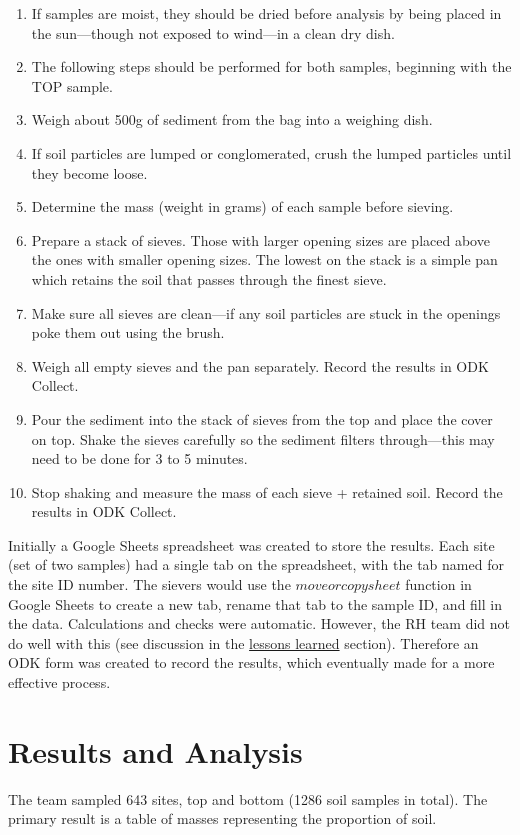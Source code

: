 \documentclass[a4paper,12pt]{article}
\begin{document}
\begin{enumerate}
  \item If samples are moist, they should be dried before analysis by being placed in the sun---though not exposed to wind---in a clean dry dish. 
  \item The following steps should be performed for both samples, beginning with the TOP sample.
  \item Weigh about 500g of sediment from the bag into a weighing dish.
  \item If soil particles are lumped or conglomerated, crush the lumped particles until they become loose.
  \item Determine the mass (weight in grams) of each sample before sieving.
  \item Prepare a stack of sieves. Those with larger opening sizes are placed above the ones with smaller opening sizes. The lowest on the stack is a simple pan which retains the soil that passes through the finest sieve.
  \item Make sure all sieves are clean---if any soil particles are stuck in the openings poke them out using the brush.
  \item Weigh all empty sieves and the pan separately. Record the results in ODK Collect.
  \item Pour the sediment into the stack of sieves from the top and place the cover on top. Shake the sieves carefully so the sediment filters through---this may need to be done for 3 to 5 minutes.
  \item Stop shaking and measure the mass of each sieve + retained soil. Record the results in ODK Collect.
\end{enumerate}

Initially a Google Sheets spreadsheet was created to store the results. Each site (set of two samples) had a single tab on the spreadsheet, with the tab named for the site ID number. The sievers would use the $move or copy sheet$ function in Google Sheets to create a new tab, rename that tab to the sample ID, and fill in the data. Calculations and checks were automatic. However, the RH team did not do well with this (see discussion in the \hyperlink{lessonslearned}{lessons learned} section). Therefore an ODK form was created to record the results, which eventually made for a more effective process. 

\newpage 
\section{Results and Analysis}
\label{resultsandanalysis}
The team sampled 643 sites, top and bottom (1286 soil samples in total). The primary result is a table of masses representing the proportion of soil.
\end{document}
